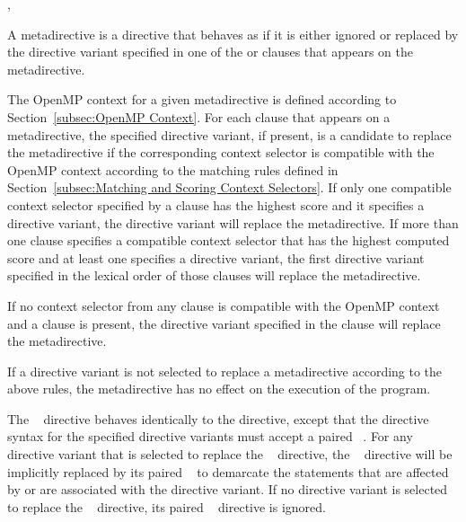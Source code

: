 \begin{indentedcodelist}
\plc{ directive-name [clause[ [},\plc{] clause] ... ]}
\end{indentedcodelist}

\descr

A metadirective is a directive that behaves as if it is either ignored or
replaced by the directive variant specified in one of the  or
 clauses that appears on the metadirective.

The OpenMP context for a given metadirective is defined according to
Section~\ref{subsec:OpenMP Context}.  For each  clause that appears
on a metadirective, the specified directive variant, if present, is a candidate
to replace the metadirective if the corresponding context selector is compatible
with the OpenMP context according to the matching rules defined in
Section~\ref{subsec:Matching and Scoring Context Selectors}.  If only one
compatible context selector specified by a  clause has the highest
score and it specifies a directive variant, the directive variant will replace
the metadirective. If more than one  clause specifies a compatible
context selector that has the highest computed score and at least one specifies
a directive variant, the first directive variant specified in the lexical order
of those  clauses will replace the metadirective.

If no context selector from any  clause is compatible with the
OpenMP context and a  clause is present, the directive variant
specified in the  clause will replace the metadirective.

If a directive variant is not selected to replace a metadirective according
to the above rules, the metadirective has no effect on the execution of the
program.

The ~ directive behaves identically to the
 directive, except that the directive syntax for the
specified directive variants must accept a paired ~.
For any directive variant that is selected to replace the
~ directive, the
~ directive will be implicitly replaced by its
paired ~ to demarcate the statements that are
affected by or are associated with the directive variant. If no directive
variant is selected to replace the ~
directive, its paired ~ directive is ignored.

